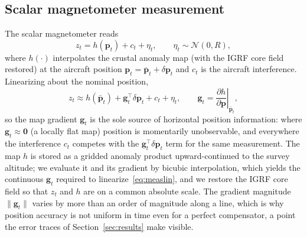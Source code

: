 \documentclass{IEEEtaes}
\begin{document}
\subsection{Scalar magnetometer measurement}
The scalar magnetometer reads
\begin{equation}
z_t = h(\mathbf{p}_t) + c_t + \eta_t, \qquad \eta_t\sim\mathcal{N}(0,R),
\label{eq:meas}
\end{equation}
where $h(\cdot)$ interpolates the crustal anomaly map (with the IGRF core field
restored) at the aircraft position $\mathbf{p}_t=\bar{\mathbf{p}}_t+\delta\mathbf{p}_t$
and $c_t$ is the aircraft interference. Linearizing about the nominal position,
\begin{equation}
z_t \approx h(\bar{\mathbf{p}}_t)+\mathbf{g}_t^{\top}\delta\mathbf{p}_t+c_t+\eta_t,
\qquad \mathbf{g}_t=\left.\frac{\partial h}{\partial\mathbf{p}}\right|_{\bar{\mathbf{p}}_t},
\label{eq:measlin}
\end{equation}
so the map gradient $\mathbf{g}_t$ is the sole source of horizontal position
information: where $\mathbf{g}_t\!\approx\!\mathbf{0}$ (a locally flat map) position
is momentarily unobservable, and everywhere the interference $c_t$ competes with the
$\mathbf{g}_t^{\top}\delta\mathbf{p}_t$ term for the same measurement. The map $h$ is
stored as a gridded anomaly product upward-continued to the survey altitude; we
evaluate it and its gradient by bicubic interpolation, which yields the continuous
$\mathbf{g}_t$ required to linearize~\eqref{eq:measlin}, and we restore the IGRF core
field so that $z_t$ and $h$ are on a common absolute scale. The gradient magnitude
$\lVert\mathbf{g}_t\rVert$ varies by more than an order of magnitude along a line,
which is why position accuracy is not uniform in time even for a perfect
compensator, a point the error traces of Section~\ref{sec:results} make visible.
\end{document}
